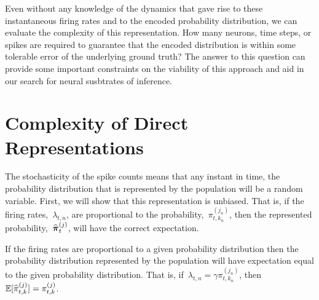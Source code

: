 Even without any knowledge of the dynamics that gave rise
to these instantaneous firing rates and to the
encoded probability distribution, we can evaluate the complexity
of this representation. How many neurons, time steps, or spikes
are required to guarantee that the encoded distribution is within
some tolerable error of the underlying ground truth? The answer
to this question can provide some important constraints on the
viability of this approach and aid in our search for neural
susbtrates of inference. 

\section{Complexity of Direct Representations}
The stochasticity of the spike counts means that any instant in 
time, the probability distribution that is represented by the population will 
be a random variable.  First, we will show that this representation 
is unbiased. That is, if the firing rates,~$\lambda_{t, n}$, 
are proportional to the probability,~$\pi_{t,k_n}^{(j_n)}$, then the 
represented probability,~$\widehat{\boldsymbol{\pi}}_{t}^{(j)}$, will have the  
correct expectation.

\begin{lemma}
\label{lem:consistency}
If the firing rates are proportional to a given
probability distribution then the probability distribution represented by the 
population will have expectation equal to the given probability distribution.
That is, if~$\lambda_{t, n}=\gamma \pi_{t,k_n}^{(j_n)}$, 
then~$\mathbb{E}[\widehat{\pi}_{t,k}^{(j)}] = \pi_{t,k}^{(j)}$.
\end{lemma}

